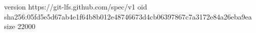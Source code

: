 version https://git-lfs.github.com/spec/v1
oid sha256:05fd5e5d67ab4e1f64b8b012e48746673d4cb06397867c7a3172e84a26eba9ea
size 22000

